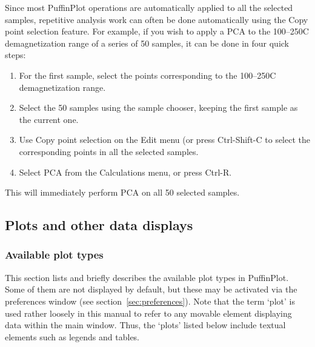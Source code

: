 \documentclass[a4paper,british]{article}
\newcommand{\ppcmd}[1]{\textsf{#1}} %
\newcommand{\caps}[1]{\MakeTextUppercase{#1}} %
\begin{document}
Since most PuffinPlot operations are automatically applied to all the
selected samples, repetitive analysis work can often be done automatically
using the \ppcmd{Copy point selection} feature. For example, if you wish to
apply a \caps{pca} to the 100--250\textdegree{}C demagnetization range of a
series of 50 samples, it can be done in four quick steps:

\begin{enumerate}

\item For the first sample, select the points corresponding to the
  100--250\textdegree{}C demagnetization range.

\item Select the 50 samples using the sample chooser, keeping the
  first sample as the current one.

\item Use \ppcmd{Copy point selection} on the \ppcmd{Edit} menu
  (or press \ppcmd{Ctrl-Shift-C} to select the corresponding points
  in all the selected samples.

\item Select \ppcmd{\caps{pca}} from the \ppcmd{Calculations} menu,
  or press \ppcmd{Ctrl-R}.

\end{enumerate}

\noindent This will immediately perform \caps{pca} on all 50 selected
samples.

\subsection{Plots and other data displays}

\subsubsection{\label{sec:plot-types}Available plot types}

This section lists and briefly describes the available plot types in
PuffinPlot. Some of them are not displayed by default, but these may be
activated via the preferences window (see section~\ref{sec:preferences}).
Note that the term `plot' is used rather loosely in this manual to refer to
any movable element displaying data within the main window. Thus, the `plots'
listed below include textual elements such as legends and tables.
\end{document}
